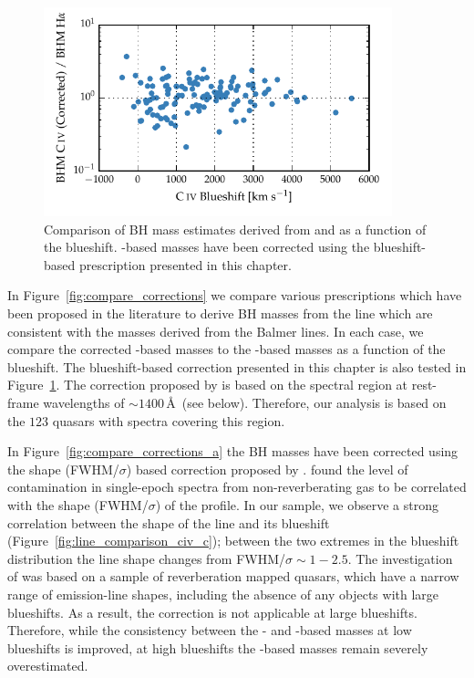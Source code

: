\begin{figure}
    \centering
    \includegraphics[width=0.9\textwidth]{figures/chapter03/corrections_coatman.pdf}
    \caption[{Comparison of corrected -based BH masses and \hans-based masses as a function of the  blueshift.}]{Comparison of BH mass estimates derived from  and \ha as a function of the  blueshift. -based masses have been corrected using the  blueshift-based prescription presented in this chapter.}
    \label{fig:compare_corrections_coatman}
\end{figure}

In Figure~\ref{fig:compare_corrections} we compare various prescriptions which have been proposed in the literature to derive BH masses from the  line which are consistent with the masses derived from the Balmer lines.
In each case, we compare the corrected -based masses to the \hans-based masses as a function of the  blueshift.
The  blueshift-based correction presented in this chapter is also tested in Figure~\ref{fig:compare_corrections_coatman}.
The correction proposed by \citet{runnoe13} is based on the spectral region at rest-frame wavelengths of $\sim$$1400$\,\AA\, (see below).
Therefore, our analysis is based on the $123$ quasars with spectra covering this region.

In Figure~\ref{fig:compare_corrections_a} the  BH masses have been corrected using the  shape (FWHM/$\sigma$) based correction proposed by \citet{denney12}.
\citet{denney12} found the level of contamination in single-epoch spectra from non-reverberating gas to be correlated with the shape (FWHM/$\sigma$) of the  profile.
In our sample, we observe a strong correlation between the shape of the  line and its blueshift (Figure~\ref{fig:line_comparison_civ_c}); between the two extremes in the  blueshift distribution the line shape changes from FWHM/$\sigma\sim1-2.5$.
The investigation of \citet{denney12} was based on a sample of reverberation mapped quasars, which have a narrow range of  emission-line shapes, including the absence of any objects with large  blueshifts.
As a result, the correction is not applicable at large  blueshifts.
Therefore, while the consistency between the \hans- and -based masses at low  blueshifts is improved, at high  blueshifts the -based masses remain severely overestimated.

